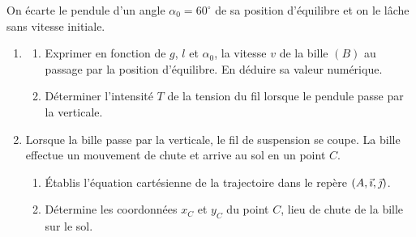 \documentclass[11pt]{article}
\begin{document}
On écarte le pendule d'un angle $\alpha_0 = 60^\circ$ de sa position d'équilibre et on le lâche sans vitesse initiale.

\begin{enumerate}
  \item \begin{enumerate}[label=\alph*.]
    \item Exprimer en fonction de $g$, $l$ et $\alpha_0$, la vitesse $v$ de la bille $(B)$ au passage par la position d'équilibre. En déduire sa valeur numérique.
    \item Déterminer l'intensité $T$ de la tension du fil lorsque le pendule passe par la verticale.
  \end{enumerate}
  \item Lorsque la bille passe par la verticale, le fil de suspension se coupe. La bille effectue un mouvement de chute et arrive au sol en un point $C$.
  \begin{enumerate}[label=\alph*.]
    \item Établis l'équation cartésienne de la trajectoire dans le repère $(A,\vec{\imath},\vec{\jmath})$.
    \item Détermine les coordonnées $x_C$ et $y_C$ du point $C$, lieu de chute de la bille sur le sol.
  \end{enumerate}
\end{enumerate}
\end{document}
